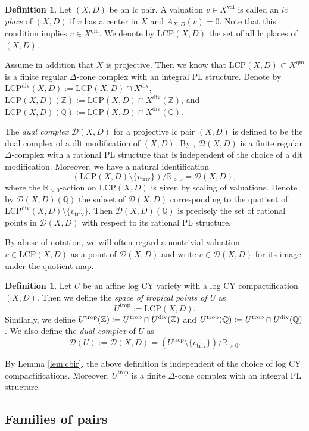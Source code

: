 \documentclass[reqno, 12pt]{amsart}
\theoremstyle{definition}
\newtheorem{defn}[prop]{Definition}
\newcommand{\bR}{\mathbb{R}}
\newcommand{\bQ}{\mathbb{Q}}
\newcommand{\bZ}{\mathbb{Z}}
\newcommand{\cD}{\mathcal{D}}
\newcommand{\trop}{\mathrm{trop}}
\newcommand{\triv}{\mathrm{triv}}
\newcommand{\val}{\mathrm{val}}
\newcommand{\qm}{\mathrm{qm}}
\newcommand{\LCP}{\mathrm{LCP}}
\newcommand{\rdiv}{\mathrm{div}}
\numberwithin{equation}{section}
\begin{document}
\begin{defn}
Let $(X,D)$ be an lc pair.
A valuation $v\in X^{\val}$ is called an \emph{lc place} of $(X,D)$ if $v$ has a center in $X$ and $A_{X,D}(v) = 0$. Note that this condition implies  $v\in X^{\qm}$. We denote by $\LCP(X,D)$ the set of all lc places of $(X,D)$. 

Assume in addition that $X$ is projective.
Then we know that $\LCP(X,D)\subset X^{\qm}$ is a finite regular $\Delta$-cone complex with an integral PL structure. Denote by $\LCP^{\rdiv}(X,D):=\LCP(X,D)\cap X^{\rdiv}$, $\LCP(X,D)(\bZ):=\LCP(X,D)\cap X^{\rdiv}(\bZ)$, and $\LCP(X,D)(\bQ):=\LCP(X,D)\cap X^{\rdiv}(\bQ)$. 

The \emph{dual complex} $\cD(X,D)$ for a projective lc pair $(X,D)$ is defined to be the dual complex of a dlt modification of $(X,D)$. By \cite{dFKX17}, $\cD(X,D)$ is a finite regular $\Delta$-complex with a rational PL structure that is  independent of the choice of a dlt modification. Moreover, we have a natural identification
\[
(\LCP(X,D)\setminus \{v_{\triv}\})/\bR_{>0} = \cD(X,D),
\]
where the $\bR_{>0}$-action on $\LCP(X,D)$ is given by scaling of valuations. Denote by $\cD(X,D)(\bQ)$ the subset of $\cD(X,D)$ corresponding to the quotient of $\LCP^{\rdiv}(X,D)\setminus \{v_{\triv}\}$. Then $\cD(X,D)(\bQ)$ is precisely the set of rational points in $\cD(X,D)$ with respect to its rational PL structure.

By abuse of notation, we will often regard a nontrivial
valuation $v\in\LCP(X,D)$ as a point of $\cD(X,D)$ and write
$v\in\cD(X,D)$ for its image under the quotient map.
\end{defn}




\begin{defn}
Let $U$ be an affine log CY variety with a log CY compactification $(X,D)$. Then we define the \emph{space of tropical points of $U$} as 
\[
U^{\trop} := \LCP(X,D).
\]
Similarly, we define $U^{\trop}(\bZ):= U^{\trop} \cap U^{\rm div}(\bZ)$ and $U^{\trop}(\bQ):= U^{\trop} \cap U^{\rm div}(\bQ)$.
We also define the \emph{dual complex} of $U$ as
\[
\cD(U):= \cD(X,D) = (U^{\trop}\setminus \{v_{\triv}\})/\bR_{>0}. 
\]
\end{defn}

By Lemma \ref{lem:cbir}, the above definition is independent of the choice of log CY compactifications. Moreover, $U^{\trop}$ is a finite $\Delta$-cone complex with an integral PL structure.

\subsection{Families of pairs}
\end{document}
